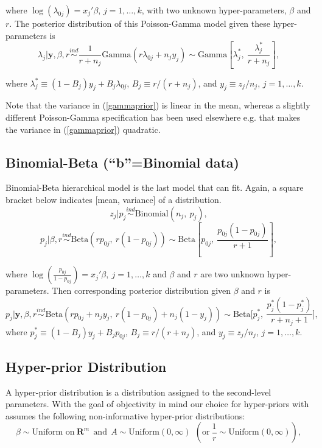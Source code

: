 \documentclass[article]{jss}
\begin{document}
where $\log(\lambda_{0j}) =x_{j}'\beta$, $j=1, \ldots, k$, with two unknown hyper-parameters, $\beta$ and $r$. The posterior distribution of this Poisson-Gamma model given these hyper-parameters is
\begin{equation} \label{gammapost}
\lambda_{j}\vert \textbf{y}, \beta, r \stackrel{ind}{\sim}\frac{1}{r + n_{j}}\textrm{Gamma}(r\lambda_{0j} + n_{j}y_{j})\sim\textrm{Gamma} \left[\lambda^{\ast}_{j},~\frac{\lambda^{\ast}_{j}}{r+n_{j}} \right],
\end{equation}

where $\lambda^{\ast}_{j} \equiv (1-B_{j})y_{j} + B_{j}\lambda_{0j}$,  $B_{j}\equiv r / (r+n_{j})$, and $y_{j}\equiv z_{j} / n_{j}$, $j=1, \ldots, k$. 


Note that the variance in (\ref{gammaprior}) is linear in the mean, whereas a slightly different Poisson-Gamma specification \citep{1997} has been used elsewhere e.g. that makes the variance in (\ref{gammaprior}) quadratic.

\subsection[Binomial-Beta]{Binomial-Beta (``b''=Binomial data)}
Binomial-Beta hierarchical model is the last model that  can fit. Again, a square bracket below indicates [mean, variance] of a distribution.
\begin{equation}
z_{j} \vert p_{j}\stackrel{ind}{\sim}\textrm{Binomial}(n_{j}, ~p_{j}),
\end{equation}
\begin{equation}
p_{j} \vert \beta, r\stackrel{ind}{\sim}\textrm{Beta}(rp_{0j},~ r(1-p_{0j}))\sim \textrm{Beta} \left[p_{0j}, ~\frac{p_{0j}(1-p_{0j})}{r + 1} \right],
\end{equation}

where $\log(\frac{p_{0j}}{1-p_{0j}}) =x_{j}'\beta, ~j=1, \ldots, k$ and $\beta$ and $r$ are two unknown hyper-parameters. Then corresponding posterior distribution given  $\beta$ and $r$ is
\begin{equation} \label{betapost}
p_{j}\vert \textbf{y}, \beta, r \stackrel{ind}{\sim}\textrm{Beta}(rp_{0j}+n_{j}y_{j},~r(1-p_{0j})+n_{j}(1-y_{j}))\sim\textrm{Beta}\bigg[p^{\ast}_{j},~ \frac{p^{\ast}_{j}(1-p^{\ast}_{j})}{r+n_{j}+1}\bigg],
\end{equation}
where $p^{\ast}_{j}\equiv(1-B_{j})y_{j}+B_{j}p_{0j}$, $B_{j}\equiv r/ (r+n_{j})$, and $y_{j}\equiv z_{j} / n_{j}$, $j=1,\ldots,k$.


\subsection[Hyper-prior Distribution]{Hyper-prior Distribution}
A hyper-prior distribution is a distribution assigned to the second-level parameters. With the goal of objectivity in mind our choice for hyper-priors with  assumes the following non-informative hyper-prior distributions:
\begin{equation}
\beta \sim \textrm{Uniform on}~ \mathbf{R}^{m}~~\textrm{and}~~A \sim \textrm{Uniform}(0, \infty) ~~(\textrm{or} ~\frac{1}{r}\sim \textrm{Uniform}(0, \infty)),
\end{equation}
\end{document}
